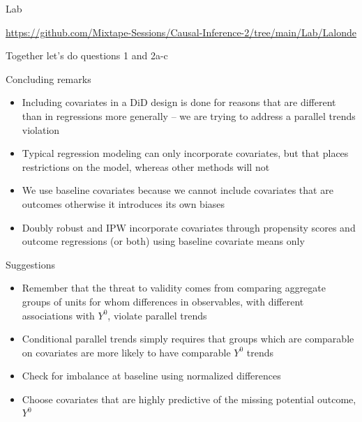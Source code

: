 \documentclass{beamer}
\begin{document}
\begin{frame}{Lab}

\url{https://github.com/Mixtape-Sessions/Causal-Inference-2/tree/main/Lab/Lalonde}

\bigskip

Together let's do questions 1 and 2a-c

\end{frame}




\begin{frame}{Concluding remarks}

\begin{itemize}
\item Including covariates in a DiD design is done for reasons that are different than in regressions more generally -- we are trying to address a parallel trends violation
\item Typical regression modeling can only incorporate covariates, but that places restrictions on the model, whereas other methods will not
\item We use baseline covariates because we cannot include covariates that are outcomes otherwise it introduces its own biases
\item Doubly robust and IPW incorporate covariates through propensity scores and outcome regressions (or both) using baseline covariate means only
\end{itemize}

\end{frame}

\begin{frame}{Suggestions}

\begin{itemize}

\item Remember that the threat to validity comes from comparing aggregate groups of units for whom differences in observables, with different associations with $Y^0$, violate parallel trends
\item Conditional parallel trends simply requires that groups which are comparable on covariates are more likely to have comparable $Y^0$ trends
\item Check for imbalance at baseline using normalized differences
\item Choose covariates that are highly predictive of the missing potential outcome, $Y^0$

\end{itemize}

\end{frame}
\end{document}
